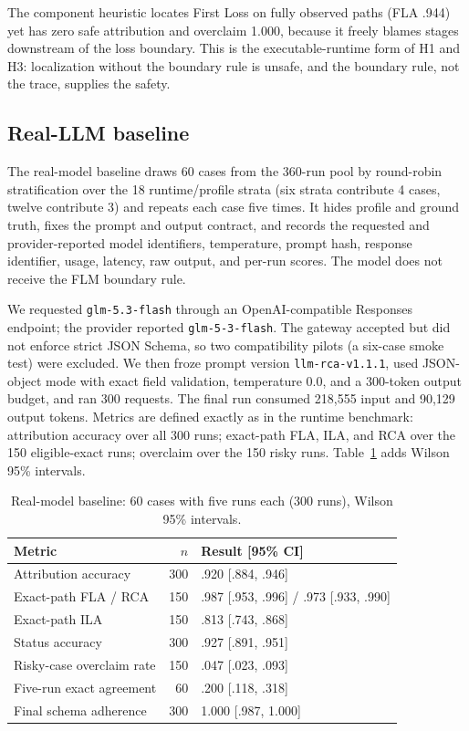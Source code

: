 \documentclass[10pt]{article}
\begin{document}
The component heuristic locates First Loss on fully observed paths (FLA .944) yet has zero safe attribution and overclaim 1.000, because it freely blames stages downstream of the loss boundary. This is the executable-runtime form of H1 and H3: localization without the boundary rule is unsafe, and the boundary rule, not the trace, supplies the safety.

\subsection{Real-LLM baseline}
\label{sec:llmbaseline}

The real-model baseline draws 60 cases from the 360-run pool by round-robin stratification over the 18 runtime/profile strata (six strata contribute 4 cases, twelve contribute 3) and repeats each case five times. It hides profile and ground truth, fixes the prompt and output contract, and records the requested and provider-reported model identifiers, temperature, prompt hash, response identifier, usage, latency, raw output, and per-run scores. The model does not receive the FLM boundary rule.

We requested \texttt{glm-5.3-flash} through an OpenAI-compatible Responses endpoint; the provider reported \texttt{glm-5-3-flash}. The gateway accepted but did not enforce strict JSON Schema, so two compatibility pilots (a six-case smoke test) were excluded. We then froze prompt version \texttt{llm-rca-v1.1.1}, used JSON-object mode with exact field validation, temperature $0.0$, and a 300-token output budget, and ran 300 requests. The final run consumed 218,555 input and 90,129 output tokens. Metrics are defined exactly as in the runtime benchmark: attribution accuracy over all 300 runs; exact-path FLA, ILA, and RCA over the 150 eligible-exact runs; overclaim over the 150 risky runs. Table~\ref{tab:llm} adds Wilson 95\% intervals.

\begin{table}[t]
\centering
\caption{Real-model baseline: 60 cases with five runs each (300 runs), Wilson 95\% intervals.}
\label{tab:llm}
\begin{tabular}{lrl}
\toprule
Metric & $n$ & Result [95\% CI] \\
\midrule
Attribution accuracy & 300 & .920 [.884, .946] \\
Exact-path FLA / RCA & 150 & .987 [.953, .996] / .973 [.933, .990] \\
Exact-path ILA & 150 & .813 [.743, .868] \\
Status accuracy & 300 & .927 [.891, .951] \\
Risky-case overclaim rate & 150 & .047 [.023, .093] \\
Five-run exact agreement & 60 & .200 [.118, .318] \\
Final schema adherence & 300 & 1.000 [.987, 1.000] \\
\bottomrule
\end{tabular}
\end{table}
\end{document}
